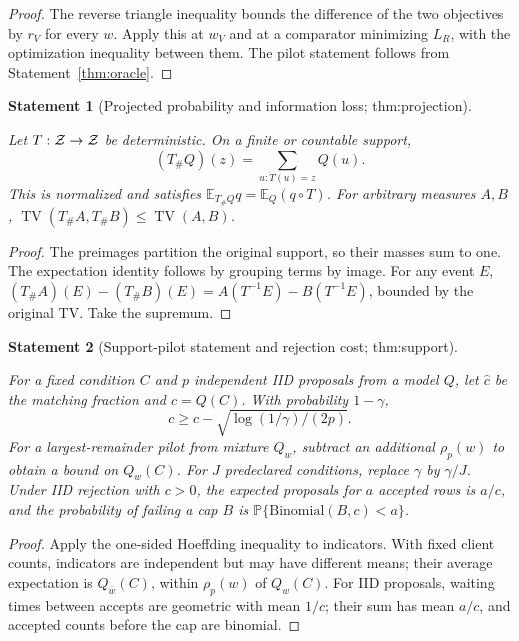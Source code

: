 \documentclass[11pt]{article}
\newtheorem{statement}{Statement}
\newcommand{\E}{\mathbb E}\newcommand{\Prb}{\mathbb P}\newcommand{\ind}{\mathbf 1}
\newcommand{\TV}{\operatorname{TV}}\newcommand{\KL}{\operatorname{KL}}
\begin{document}
\begin{proof}
The reverse triangle inequality bounds the difference of the two objectives by $r_V$ for every $w$. Apply this at $w_V$ and at a comparator minimizing $L_R$, with the optimization inequality between them. The pilot statement follows from Statement~\ref{thm:oracle}.
\end{proof}

\begin{statement}[Projected probability and information loss; thm:projection]\label{thm:projection}

Let $T:\mathcal Z\to\mathcal Z$ be deterministic. On a finite or countable support,
\begin{equation}\label{eq:pushforward}
(T_\#Q)(z)=\sum_{u:T(u)=z}Q(u).
\end{equation}
This is normalized and satisfies $\E_{T_\#Q}q=\E_Q(q\circ T)$. For arbitrary measures $A,B$, $\TV(T_\#A,T_\#B)\le\TV(A,B)$.

\end{statement}

\begin{proof}
The preimages partition the original support, so their masses sum to one. The expectation identity follows by grouping terms by image. For any event $E$, $(T_\#A)(E)-(T_\#B)(E)=A(T^{-1}E)-B(T^{-1}E)$, bounded by the original TV. Take the supremum.
\end{proof}

\begin{statement}[Support-pilot statement and rejection cost; thm:support]\label{thm:support}

For a fixed condition $C$ and $p$ independent IID proposals from a model $Q$, let $\widehat c$ be the matching fraction and $c=Q(C)$. With probability $1-\gamma$,
\begin{equation}
c\ge\widehat c-\sqrt{\log(1/\gamma)/(2p)}.
\end{equation}
For a largest-remainder pilot from mixture $Q_w$, subtract an additional $\rho_p(w)$ to obtain a bound on $Q_w(C)$. For $J$ predeclared conditions, replace $\gamma$ by $\gamma/J$. Under IID rejection with $c>0$, the expected proposals for $a$ accepted rows is $a/c$, and the probability of failing a cap $B$ is $\Prb\{\mathrm{Binomial}(B,c)<a\}$.

\end{statement}

\begin{proof}
Apply the one-sided Hoeffding inequality to indicators. With fixed client counts, indicators are independent but may have different means; their average expectation is $Q_{\bar w}(C)$, within $\rho_p(w)$ of $Q_w(C)$. For IID proposals, waiting times between accepts are geometric with mean $1/c$; their sum has mean $a/c$, and accepted counts before the cap are binomial.
\end{proof}
\end{document}
